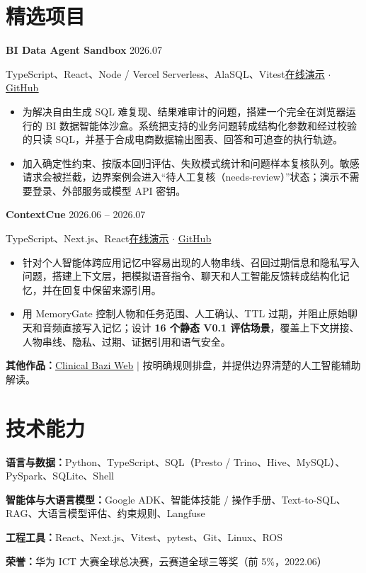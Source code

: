 \documentclass[a4paper,10pt]{article}
\newcommand{\resumeProject}[4]{%
  {\fontsize{10.3}{12.1}\selectfont\bfseries #1}%
  \hfill{\fontsize{9.1}{11.1}\selectfont\color{muted}#2}\par
  {\fontsize{9.2}{11.3}\selectfont\color{muted}#3\hfill#4}\par\vspace{-0.5pt}
}
\newcommand{\skillline}[2]{%
  \textbf{#1}\hspace{0.45em}#2\par
}
\begin{document}
\section{精选项目}
\resumeProject
  {BI Data Agent Sandbox}
  {2026.07}
  {TypeScript、React、Node / Vercel Serverless、AlaSQL、Vitest}
  {\href{https://data-agent-sandbox.vercel.app/}{\underline{在线演示}} $\cdot$ \href{https://github.com/HaoPan036/Data-Agent-Sandbox}{\underline{GitHub}}}
\begin{itemize}
  \item 为解决自由生成 SQL 难复现、结果难审计的问题，搭建一个完全在浏览器运行的 BI 数据智能体沙盒。系统把支持的业务问题转成结构化参数和经过校验的只读 SQL，并基于合成电商数据输出图表、回答和可追查的执行轨迹。
  \item 加入确定性约束、按版本回归评估、失败模式统计和问题样本复核队列。敏感请求会被拦截，边界案例会进入“待人工复核（needs-review）”状态；演示不需要登录、外部服务或模型 API 密钥。
\end{itemize}

\resumeProject
  {ContextCue}
  {2026.06 -- 2026.07}
  {TypeScript、Next.js、React}
  {\href{https://contex-cue.vercel.app/}{\underline{在线演示}} $\cdot$ \href{https://github.com/HaoPan036/ContexCue}{\underline{GitHub}}}
\begin{itemize}
  \item 针对个人智能体跨应用记忆中容易出现的人物串线、召回过期信息和隐私写入问题，搭建上下文层，把模拟语音指令、聊天和人工智能反馈转成结构化记忆，并在回复中保留来源引用。
  \item 用 MemoryGate 控制人物和任务范围、人工确认、TTL 过期，并阻止原始聊天和音频直接写入记忆；设计 \textbf{16 个静态 V0.1 评估场景}，覆盖上下文拼接、人物串线、隐私、过期、证据引用和语气安全。
\end{itemize}

\vspace{-1pt}
\textbf{其他作品：}\href{https://clinical-bazi-web.vercel.app/}{\underline{Clinical Bazi Web}} $|$ 按明确规则排盘，并提供边界清楚的人工智能辅助解读。

\section{技术能力}
\skillline{语言与数据：}{Python、TypeScript、SQL（Presto / Trino、Hive、MySQL）、PySpark、SQLite、Shell}
\skillline{智能体与大语言模型：}{Google ADK、智能体技能 / 操作手册、Text-to-SQL、RAG、大语言模型评估、约束规则、Langfuse}
\skillline{工程工具：}{React、Next.js、Vitest、pytest、Git、Linux、ROS}
\skillline{荣誉：}{华为 ICT 大赛全球总决赛，云赛道全球三等奖（前 5\%，2022.06）}
\end{document}
